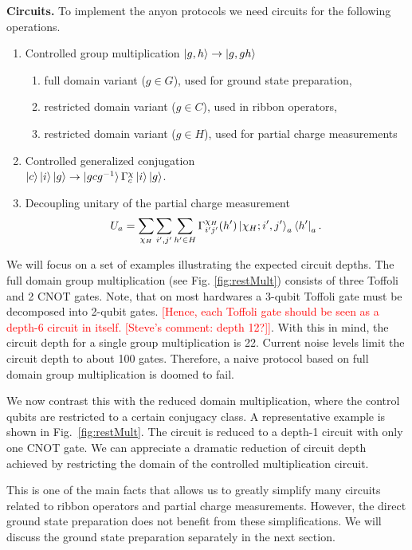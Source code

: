 \documentclass[two column]{article}
\newcommand{\caro}[1]{\textcolor{red}{[#1]}}
\begin{document}
\textbf{Circuits.} To implement the anyon protocols we need circuits for the following operations.
\begin{enumerate}
    \item Controlled group multiplication $\ket{g, h} \rightarrow \ket{g, gh}$  \begin{enumerate}
        \item full domain variant ($g \in G$), used for ground state preparation,
        \item restricted domain variant ($g \in C$), used in ribbon operators,
        \item restricted domain variant ($g \in H$), used for partial charge measurements 
    \end{enumerate}
    \item Controlled generalized conjugation\\ $\ket{c} \ket{i}\ket{g} \rightarrow \ket{gcg^{-1}} \Gamma^\chi_{c} \ket{i}\ket{g}$.
    \item Decoupling unitary of the partial charge measurement $$ U_a = \sum_{\chi_H}\sum_{i', j'}\sum_{h'\in H}  \Gamma^{\chi_H}_{i'j'}(h')  \ket{\chi_H; i', j'}_a\bra{h'}_a. $$
\end{enumerate} 

We will focus on a set of examples illustrating the expected circuit depths. The full domain group multiplication (see Fig. \ref{fig:restMult}) consists of three Toffoli and 2 CNOT gates. Note, that on most hardwares a 3-qubit Toffoli gate must be decomposed into 2-qubit gates. \caro{Hence, each Toffoli gate should be seen as a depth-6 circuit in itself. [Steve's comment: depth 12?]}. With this in mind, the circuit depth for a single group multiplication is 22. Current noise levels limit the circuit depth to about 100 gates. Therefore, a naive protocol based on full domain group multiplication is doomed to fail. 

We now contrast this with the reduced domain multiplication, where the control qubits are restricted to a certain conjugacy class. A representative example is shown in Fig.~\ref{fig:restMult}. The circuit is reduced to a depth-1 circuit with only one CNOT gate. We can appreciate a dramatic reduction of circuit depth achieved by restricting the domain of the controlled multiplication circuit.

This is one of the main facts that allows us to greatly simplify many circuits related to ribbon operators and partial charge measurements. However, the direct ground state preparation does not benefit from these simplifications. We will discuss the ground state preparation separately in the next section.
\end{document}
